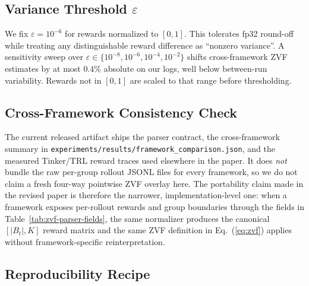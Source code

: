 \subsection{Variance Threshold $\varepsilon$}

We fix $\varepsilon = 10^{-6}$ for rewards normalized to $[0,1]$. This
tolerates fp32 round-off while treating any distinguishable reward
difference as ``nonzero variance''. A sensitivity sweep over
$\varepsilon \in \{10^{-8}, 10^{-6}, 10^{-4}, 10^{-2}\}$ shifts
cross-framework ZVF estimates by at most $0.4\%$ absolute on our logs,
well below between-run variability. Rewards not in $[0,1]$ are scaled to
that range before thresholding.

\subsection{Cross-Framework Consistency Check}

The current released artifact ships the parser contract, the
cross-framework summary in
\texttt{experiments/results/framework\_comparison.json}, and the measured
Tinker/TRL reward traces used elsewhere in the paper. It does
\emph{not} bundle the raw per-group rollout JSONL files for every framework,
so we do not claim a fresh four-way pointwise ZVF overlay here. The
portability claim made in the revised paper is therefore the narrower,
implementation-level one: when a framework exposes per-rollout rewards and
group boundaries through the fields in Table~\ref{tab:zvf-parser-fields},
the same normalizer produces the canonical $[|B_t|, K]$ reward matrix and
the same ZVF definition in Eq.~(\ref{eq:zvf}) applies without
framework-specific reinterpretation.

\subsection{Reproducibility Recipe}

